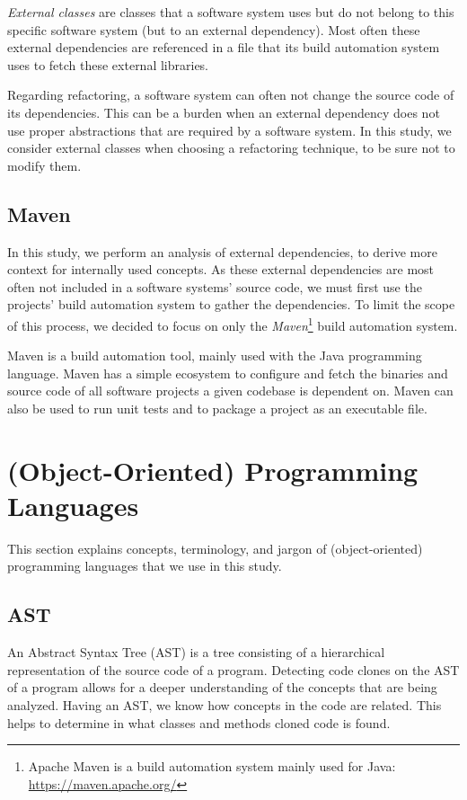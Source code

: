 \textit{External classes} are classes that a software system uses but do not belong to this specific software system (but to an external dependency). Most often these external dependencies are referenced in a file that its build automation system uses to fetch these external libraries.

Regarding refactoring, a software system can often not change the source code of its dependencies. This can be a burden when an external dependency does not use proper abstractions that are required by a software system. In this study, we consider external classes when choosing a refactoring technique, to be sure not to modify them.

\subsection{Maven}
In this study, we perform an analysis of external dependencies, to derive more context for internally used concepts. As these external dependencies are most often not included in a software systems' source code, we must first use the projects' build automation system to gather the dependencies. To limit the scope of this process, we decided to focus on only the \textit{Maven}\footnote{Apache Maven is a build automation system mainly used for Java: \url{https://maven.apache.org/}} build automation system.

Maven is a build automation tool, mainly used with the Java programming language. Maven has a simple ecosystem to configure and fetch the binaries and source code of all software projects a given codebase is dependent on. Maven can also be used to run unit tests and to package a project as an executable file.

\section{(Object-Oriented) Programming Languages}
This section explains concepts, terminology, and jargon of (object-oriented) programming languages that we use in this study.

\subsection{AST} \label{sec:astbackground}
An Abstract Syntax Tree (AST) is a tree consisting of a hierarchical representation of the source code of a program. Detecting code clones on the AST of a program allows for a deeper understanding of the concepts that are being analyzed. Having an AST, we know how concepts in the code are related. This helps to determine in what classes and methods cloned code is found.

